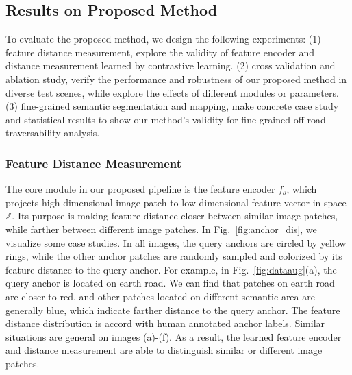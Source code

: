 \documentclass[letterpaper, 10 pt, conference]{ieeeconf}  %
\begin{document}
\subsection{Results on Proposed Method}
To evaluate the proposed method, we design the following experiments: (1) feature distance measurement, explore the validity of feature encoder and distance measurement learned by contrastive learning. (2) cross validation and ablation study, verify the performance and robustness of our proposed method in diverse test scenes, while explore the effects of different modules or parameters. (3) fine-grained semantic segmentation and mapping, make concrete case study and statistical results to show our method's validity for fine-grained off-road traversability analysis.


\subsubsection{Feature Distance Measurement}
The core module in our proposed pipeline is the feature encoder $f_\theta$, which projects high-dimensional image patch to low-dimensional feature vector in space $\mathbb{Z}$. Its purpose is making feature distance closer between similar image patches, while farther between different image patches. In Fig.~\ref{fig:anchor_dis}, we visualize some case studies. In all images, the query anchors are circled by yellow rings, while the other anchor patches are randomly sampled and colorized by its feature distance to the query anchor. For example, in Fig.~\ref{fig:dataaug}(a), the query anchor is located on earth road. We can find that patches on earth road are closer to red, and other patches located on different semantic area are generally blue, which indicate farther distance to the query anchor. The feature distance distribution is accord with human annotated anchor labels. Similar situations are general on images (a)-(f). As a result, the learned feature encoder and distance measurement are able to distinguish similar or different image patches.
\end{document}
